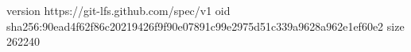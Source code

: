 version https://git-lfs.github.com/spec/v1
oid sha256:90ead4f62f86c20219426f9f90e07891c99e2975d51c339a9628a962e1ef60e2
size 262240
